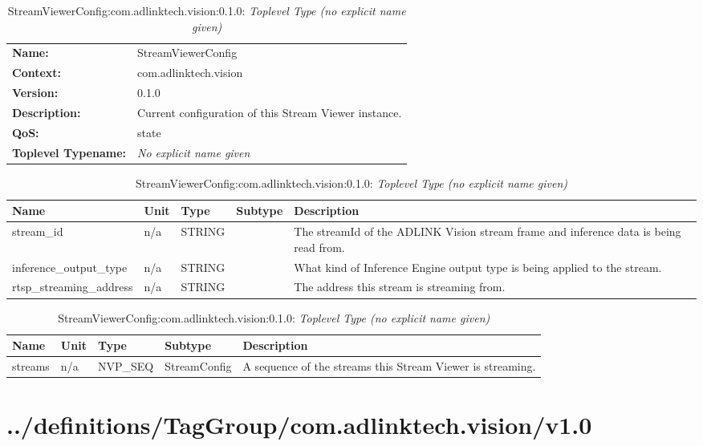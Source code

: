 \begin{table}[H]
\begin{tabularx}{\textwidth}{l X} 
       \textbf{Name:} & StreamViewerConfig \\ 
	   \textbf{Context:} & com.adlinktech.vision \\ 
	   \textbf{Version:} & 0.1.0 \\ 
	   \textbf{Description:} & Current configuration of this Stream Viewer instance. \\ 
	   \textbf{QoS:} & state \\
	   \textbf{Toplevel Typename:} & \textit{No explicit name given} \\ 
\end{tabularx}
\caption{StreamViewerConfig:com.adlinktech.vision:0.1.0}\label{StreamViewerConfigTagGroup.json:table:StreamViewerConfig}
\bigskip
\begin{tabularx}{\textwidth}{l l l l X} 
	 \textbf{Name} & \textbf{Unit} & \textbf{Type} & \textbf{Subtype} & \textbf{Description} \\
	 \midrule
   stream\_id & n/a & STRING &  & The streamId of the ADLINK Vision stream frame and inference data is being read from. \\
   inference\_output\_type & n/a & STRING &  & What kind of Inference Engine output type is being applied to the stream. \\
   rtsp\_streaming\_address & n/a & STRING &  & The address this stream is streaming from. \\
\end{tabularx}
\caption{StreamViewerConfig:com.adlinktech.vision:0.1.0: StreamConfig}\label{StreamViewerConfigTagGroup.json:table:StreamViewerConfig-StreamConfig}

\bigskip
\begin{tabularx}{\textwidth}{l l l l X} 
	 \textbf{Name} & \textbf{Unit} & \textbf{Type} & \textbf{Subtype} & \textbf{Description} \\
	 \midrule
   streams & n/a & NVP\_SEQ & StreamConfig & A sequence of the streams this Stream Viewer is streaming. \\
\end{tabularx}
\caption{StreamViewerConfig:com.adlinktech.vision:0.1.0: \textit{Toplevel Type (no explicit name given)}}\label{StreamViewerConfigTagGroup.json:table:StreamViewerConfig-no-type-given}


\end{table}

\section{../definitions/TagGroup/com.adlinktech.vision/v1.0}
